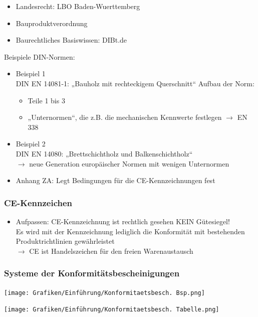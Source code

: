 \documentclass[fleqn,twoside]{article}
\begin{document}
    \begin{itemize}
        \item Landesrecht: LBO Baden-Wuerttemberg
        \item Bauproduktverordnung
        \item Baurechtliches Basiswissen: DIBt.de
    \end{itemize}
        Beispiele DIN-Normen:
        \begin{itemize}
            \item Beispiel 1\\
                DIN EN 14081-1: „Bauholz mit rechteckigem Querschnitt“
                Aufbau der Norm:
                \begin{itemize}
                    \item Teile 1 bis 3
                    \item „Unternormen“, die z.B. die mechanischen Kennwerte festlegen $\rightarrow$ EN 338
                \end{itemize}
            \item Beispiel 2\\
                DIN EN 14080: „Brettschichtholz und Balkenschichtholz“ \\ 
                $\rightarrow$ neue Generation europäischer Normen mit wenigen Unternormen
        \end{itemize}
        \begin{itemize}
            \item Anhang ZA: Legt Bedingungen für die CE-Kennzeichnungen fest
        \end{itemize}
    
    \subsubsection{CE-Kennzeichen}
        \begin{itemize}
            \item Aufpassen: CE-Kennzeichnung ist rechtlich gesehen KEIN Gütesiegel!\\
            Es wird mit der Kennzeichnung lediglich die Konformität mit bestehenden Produktrichtlinien gewährleistet\\
            $\rightarrow$ CE ist Handelszeichen für den freien Warenaustausch
        \end{itemize}
    
    \subsubsection{Systeme der Konformitätsbescheinigungen}
        \begin{minipage}{0.5\textwidth}
            \texttt{[image: Grafiken/Einführung/Konformitaetsbesch. Bsp.png]}
        \end{minipage}
        \begin{minipage}{0.5\textwidth}
            \texttt{[image: Grafiken/Einführung/Konformitaetsbesch. Tabelle.png]}
        \end{minipage}
\end{document}
